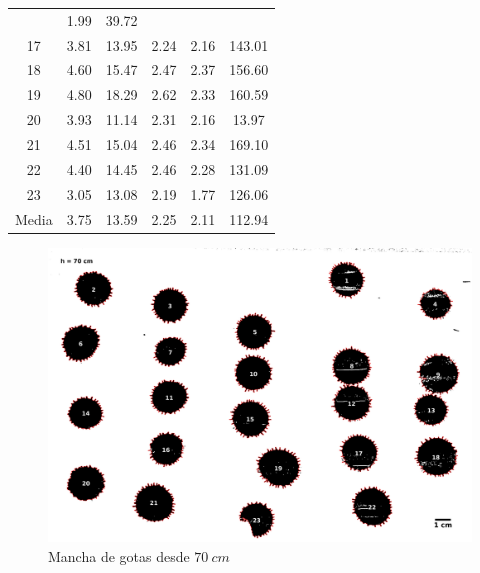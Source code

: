 \begin{table}[H]
\begin{tabular}{cccccc}
             & 1.99 & 39.72  \\ 17 & 3.81 & 13.95 & 2.24 & 2.16 & 143.01 \\ 18
             & 4.60 & 15.47 & 2.47 & 2.37 & 156.60 \\ 19 & 4.80 & 18.29 & 2.62
             & 2.33 & 160.59 \\ 20 & 3.93 & 11.14 & 2.31 & 2.16 & 13.97  \\ 21
             & 4.51 & 15.04 & 2.46 & 2.34 & 169.10 \\ 22 & 4.40 & 14.45 & 2.46
             & 2.28 & 131.09 \\ 23 & 3.05 & 13.08 & 2.19 & 1.77 & 126.06 \\
    \midrule Media & 3.75 & 13.59 & 2.25 & 2.11 & 112.94 \\ \bottomrule
\end{tabular} \end{table}

\begin{figure}[H] \centering
\includegraphics[width=0.75\linewidth]{src/70-1.png} \caption{Mancha de gotas
desde $70\ cm$} \label{fig:70cm-1} \end{figure}


